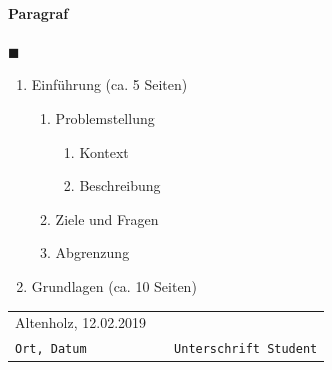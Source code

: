 \documentclass[             %
    final,                  %
    ngerman,                %
    paper=A4,               %
    paper=portrait,         %
    twoside,                %
    open=right,             %
    onecolumn,              %
    fontsize=11pt,          %
    BCOR=7.5mm,               %
    DIV=10,                 %
    titlepage=true,         %
    toc=bib,                %
    toc=idx,                %
    toc=listof,             %
    chapterentrydots=false, %
    numbers=noendperiod,    %
    captions=signature,     %
    captions=figuresignature,   %
    captions=tableheading,  %
    captions=nooneline,     %
    bibliography=openstyle, %
    automark                %
]{scrbook}                  %
\begin{document}
\paragraph{Paragraf}
\blindtext %


\begin{flushright}
$\blacksquare$\\
\end{flushright}

\begin{enumerate}
    \item Einführung (ca. 5 Seiten)
        \begin{enumerate}[label*=\arabic*.]
            \item Problemstellung
                \begin{enumerate}[label*=\arabic*.]
                    \item Kontext
                    \item Beschreibung
                \end{enumerate}
            \item Ziele und Fragen
            \item Abgrenzung
        \end{enumerate}
    \item Grundlagen (ca. 10 Seiten)
\end{enumerate}


\begin{tabular}{L{5.5cm} C{0.5cm} L{7.5cm}}
    Altenholz, 12.02.2019 & & \\
    \texttt{Ort, Datum} & & \texttt{Unterschrift Student}
\end{tabular}
\end{document}
